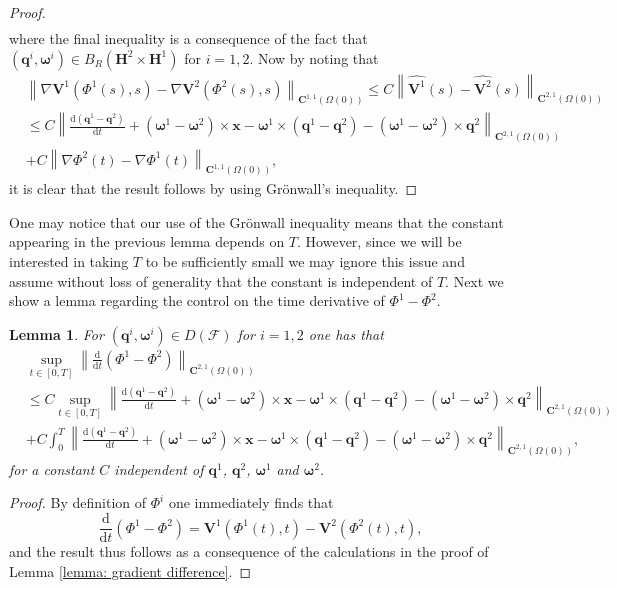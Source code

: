 \documentclass[a4paper]{amsart}
\numberwithin{equation}{section}
\newcommand{\grad}{\nabla}
\theoremstyle{plain}
\newtheorem{lemma}[theorem]{Lemma}
\newcommand{\mbf}[1]{\mathbf{#1}}
\begin{document}
\begin{proof}
\begin{align*}
	\end{align*}
	where the final inequality is a consequence of the fact that $(\mbf{q}^i, \boldsymbol{\omega}^i) \in B_R(\mbf{H}^2 \times \mbf{H}^1)$ for $i = 1,2$.
	Now by noting that
	\begin{align*}
		&\left\|\grad\mbf{V}^1(\Phi^1(s),s) - \grad\mbf{V}^2(\Phi^2(s),s) \right\|_{\mbf{C}^{1,1}(\Omega(0))} \leq C\left\|\widehat{\mbf{V}^1}(s) - \widehat{\mbf{V}^2}(s)  \right\|_{\mbf{C}^{2,1}(\Omega(0))}\\
		&\leq C \left\| \frac{\mathrm{d}(\mbf{q}^1-\mbf{q}^2)}{\mathrm{d}t} + (\boldsymbol{\omega}^1 - \boldsymbol{\omega}^2)\times \mbf{x} - \boldsymbol{\omega}^1 \times (\mbf{q}^1 - \mbf{q}^2) - (\boldsymbol{\omega}^1 - \boldsymbol{\omega}^2)\times \mbf{q}^2  \right\|_{\mbf{C}^{2,1}(\Omega(0))}\\
        &+ C \left\| \grad\Phi^2(t) - \grad\Phi^1(t) \right\|_{\mbf{C}^{1,1}(\Omega(0))},
	\end{align*}
	it is clear that the result follows by using Gr\"onwall's inequality.
\end{proof}

One may notice that our use of the Gr\"onwall inequality means that the constant appearing in the previous lemma depends on $T$.
However, since we will be interested in taking $T$ to be sufficiently small we may ignore this issue and assume without loss of generality that the constant is independent of $T$.
Next we show a lemma regarding the control on the time derivative of $\Phi^1 - \Phi^2$.

\begin{lemma}
\label{lemma: gradient difference ddt}
For $(\mbf{q}^i, \boldsymbol{\omega}^i) \in D(\mathscr{F})$ for $i=1,2$ one has that
	\begin{align*}
    &\sup_{t \in [0,T]}\left\|\frac{\mathrm{d}}{\mathrm{d}t}(\Phi^1 - \Phi^2) \right\|_{\mbf{C}^{2,1}(\Omega(0))}\\ 
	&\leq C \sup_{t \in [0,T]}\left\| \frac{\mathrm{d}(\mbf{q}^1-\mbf{q}^2)}{\mathrm{d}t} + (\boldsymbol{\omega}^1 - \boldsymbol{\omega}^2)\times \mbf{x} - \boldsymbol{\omega}^1 \times (\mbf{q}^1 - \mbf{q}^2) - (\boldsymbol{\omega}^1 - \boldsymbol{\omega}^2)\times \mbf{q}^2  \right\|_{\mbf{C}^{2,1}(\Omega(0))}\\
    &+ C \int_0^T \left\| \frac{\mathrm{d}(\mbf{q}^1-\mbf{q}^2)}{\mathrm{d}t} + (\boldsymbol{\omega}^1 - \boldsymbol{\omega}^2)\times \mbf{x} - \boldsymbol{\omega}^1 \times (\mbf{q}^1 - \mbf{q}^2) - (\boldsymbol{\omega}^1 - \boldsymbol{\omega}^2)\times \mbf{q}^2  \right\|_{\mbf{C}^{2,1}(\Omega(0))},
	\end{align*}
    for a constant $C$ independent of $\mbf{q}^1$, $\mbf{q}^2$, $\boldsymbol{\omega}^1$ and $\boldsymbol{\omega}^2$.
\end{lemma}
\begin{proof}
	By definition of $\Phi^i$ one immediately finds that
    \[ \frac{\mathrm{d}}{\mathrm{d}t}(\Phi^1 - \Phi^2) = \mbf{V}^1(\Phi^1(t),t) - \mbf{V}^2(\Phi^2(t),t), \]
    and the result thus follows as a consequence of the calculations in the proof of Lemma \ref{lemma: gradient difference}.
\end{proof}
\end{document}
